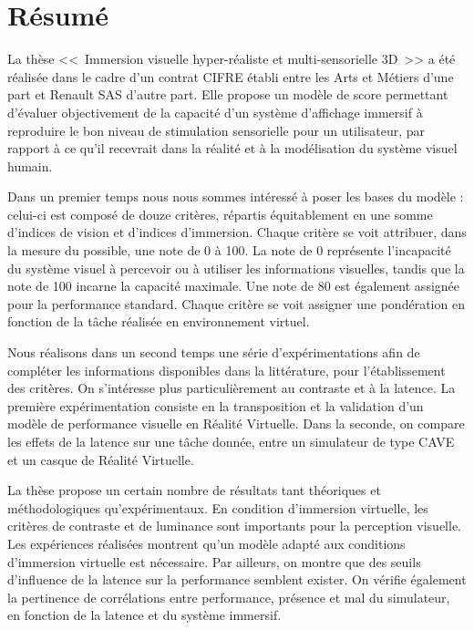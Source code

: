 \chapter*{Résumé}
\par La thèse <<~Immersion visuelle hyper-réaliste et multi-sensorielle 3D~>> a été réalisée dans le cadre d’un contrat CIFRE établi entre les Arts et Métiers d’une part et Renault SAS d’autre part. Elle propose un modèle de score permettant d’évaluer objectivement de la capacité d’un système d’affichage immersif à reproduire le bon niveau de stimulation sensorielle pour un utilisateur, par rapport à ce qu’il recevrait dans la réalité et à la modélisation du système visuel humain.

\par Dans un premier temps nous nous sommes intéressé à poser les bases du modèle : celui-ci est composé de douze critères, répartis équitablement en une somme d’indices de vision et d’indices d’immersion. Chaque critère se voit attribuer, dans la mesure du possible, une note de 0 à 100. La note de 0 représente l’incapacité du système visuel à percevoir ou à utiliser les informations visuelles, tandis que la note de 100 incarne la capacité maximale. Une note de 80 est également assignée pour la performance standard. Chaque critère se voit assigner une pondération en fonction de la tâche réalisée en environnement virtuel.

\par Nous réalisons dans un second temps une série d’expérimentations afin de compléter les informations disponibles dans la littérature, pour l’établissement des critères. On s’intéresse plus particulièrement au contraste et à la latence. La première expérimentation consiste en la transposition et la validation d’un modèle de performance visuelle en Réalité Virtuelle. Dans la seconde, on compare les effets de la latence sur une tâche donnée, entre un simulateur de type CAVE et un casque de Réalité Virtuelle.

\par La thèse propose un certain nombre de résultats tant théoriques et méthodologiques qu’expérimentaux. En condition d’immersion virtuelle, les critères de contraste et de luminance sont importants pour la perception visuelle. Les expériences réalisées montrent qu’un modèle adapté aux conditions d’immersion virtuelle est nécessaire. Par ailleurs, on montre que des seuils d’influence de la latence sur la performance semblent exister. On vérifie également la pertinence de corrélations entre performance, présence et mal du simulateur, en fonction de la latence et du système immersif.


